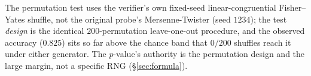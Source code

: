 \documentclass[11pt,a4paper]{article}
\begin{document}
\noindent The permutation test uses the verifier's own fixed-seed
linear-congruential Fisher--Yates shuffle, not the original probe's
Mersenne-Twister (seed \(1234\)); the test \emph{design} is the identical
\(200\)-permutation leave-one-out procedure, and the observed accuracy
(\(0.825\)) sits so far above the chance band that \(0/200\) shuffles reach it
under either generator. The \(p\)-value's authority is the permutation design
and the large margin, not a specific RNG (\S\ref{sec:formula}).



\end{document}
